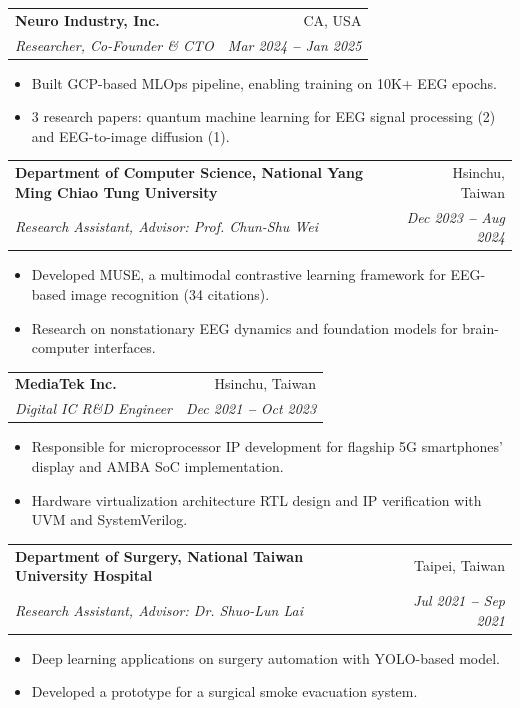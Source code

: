 \documentclass[letterpaper,10pt]{article}
\makeatletter
\newif\ifindustry
\newcommand{\resumeItem}[1]{
  \item\small{
    {#1 \vspace{-2pt}}
  }
}
\newcommand{\resumeSubheading}[4]{
  \vspace{-2pt}\item
    \begin{tabular*}{0.97\textwidth}[t]{l@{\extracolsep{\fill}}r}
      \textbf{#1} & #2 \\
      \textit{\small#3} & \textit{\small #4} \\
    \end{tabular*}\vspace{-7pt}
}
\newcommand{\resumeItemListStart}{\begin{itemize}}
\newcommand{\resumeItemListEnd}{\end{itemize}\vspace{-5pt}}
\makeatother
\begin{document}
        
    \resumeSubheading
      {Neuro Industry, Inc.}{CA, USA}
      {Researcher, Co-Founder \& CTO }{Mar 2024 \textbf{--} Jan 2025}
        \resumeItemListStart
            \resumeItem{Built GCP-based MLOps pipeline, enabling training on 10K+ EEG epochs.}
            \resumeItem{3 research papers: quantum machine learning for EEG signal processing (2) and EEG-to-image diffusion (1).}
        \resumeItemListEnd
        
    \resumeSubheading
      {Department of Computer Science, National Yang Ming Chiao Tung University}{Hsinchu, Taiwan}
      {Research Assistant, Advisor: Prof. Chun-Shu Wei}{Dec 2023 \textbf{--} Aug 2024}
        \resumeItemListStart
            \resumeItem{Developed MUSE, a multimodal contrastive learning framework for EEG-based image recognition (34 citations).}
            \resumeItem{Research on nonstationary EEG dynamics and foundation models for brain-computer interfaces.}
        \resumeItemListEnd

    \resumeSubheading
      {MediaTek Inc.}{Hsinchu, Taiwan}
      {Digital IC R\&D Engineer}{Dec 2021 \textbf{--} Oct 2023}
        \resumeItemListStart
\ifindustry
            \resumeItem{Microprocessor IP for flagship 5G smartphone display SoCs: RTL design of a hardware-virtualization architecture and IP verification with UVM/SystemVerilog.}
\else
            \resumeItem{Responsible for microprocessor IP development for flagship 5G smartphones' display and AMBA SoC implementation.}
            \resumeItem{Hardware virtualization architecture RTL design and IP verification with UVM and SystemVerilog.}
\fi
        \resumeItemListEnd

\ifindustry\else
    \resumeSubheading
      {Department of Surgery, National Taiwan University Hospital}{Taipei, Taiwan}
      {Research Assistant, Advisor: Dr. Shuo-Lun Lai }{Jul 2021 \textbf{--} Sep 2021}
        \resumeItemListStart
            \resumeItem{Deep learning applications on surgery automation with YOLO-based model.}
            \resumeItem{Developed a prototype for a surgical smoke evacuation system.}
        \resumeItemListEnd
\fi
\end{document}
